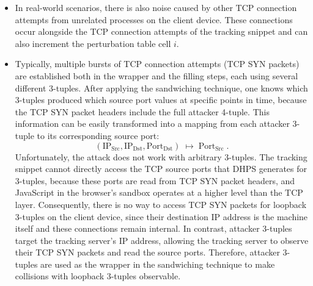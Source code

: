 \documentclass{report}
\begin{document}
\begin{itemize}
	\item {} In real-world scenarios, there is also \alert{noise} caused by other TCP connection attempts from unrelated processes on the client device. These connections occur alongside the TCP connection attempts of the tracking snippet and can also increment the perturbation table cell \( i \).
	\item {} Typically, multiple \alert{bursts of TCP connection attempts} (TCP SYN packets) are established both in the wrapper and the filling steps, each using several different 3-tuples. After applying the sandwiching technique, one knows which 3-tuples produced which source port values at specific points in time, because the \alert{TCP SYN packet headers} include the full attacker 4-tuple. This information can be easily transformed into a mapping from each attacker 3-tuple to its corresponding source port:
	\[
		(\mathrm{IP_{Src}}, \mathrm{IP_{Dst}}, \mathrm{Port_{Dst}}) \;\mapsto\; \mathrm{Port_{Src}}\;\text{.}
	\]
	 Unfortunately, the attack does not work with arbitrary 3-tuples. The tracking snippet cannot directly access the TCP source ports that DHPS generates for 3-tuples, because these ports are read from TCP SYN packet headers, and JavaScript in the \alert{browser’s sandbox} operates at a higher level than the TCP layer. Consequently, there is no way to access TCP SYN packets for \alert{loopback 3-tuples} on the client device, since their destination IP address is the machine itself and these connections remain internal. In contrast, \alert{attacker 3-tuples} target the tracking server’s IP address, allowing the \alert{tracking server} to observe their TCP SYN packets and read the source ports. Therefore, attacker 3-tuples are used as the wrapper in the sandwiching technique to make collisions with loopback 3-tuples observable.
\end{itemize}
\end{document}
